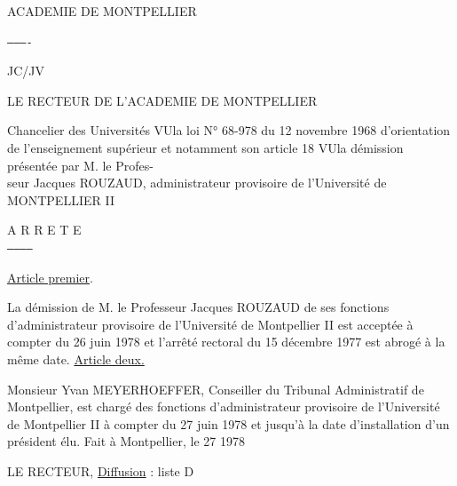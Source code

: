 
ACADEMIE DE MONTPELLIER

\texttt{----------}

JC/JV

LE RECTEUR DE L'ACADEMIE DE MONTPELLIER

Chancelier des Universités
VU\qquad la loi N° 68-978 du 12 novembre 1968 d'orientation de l'enseignement supérieur et notamment son article 18
VU\qquad la démission présentée par M. le Profes-\\
seur Jacques ROUZAUD, administrateur provisoire de l'Université de MONTPELLIER II
\begin{center}
A R R E T E\\
\texttt{-----------}
\end{center}
\uline{Article premier}.

La démission de M. le Professeur Jacques ROUZAUD de ses fonctions d'administrateur provisoire de l'Université de Montpellier II est acceptée à compter du 26 juin 1978 et l'arrêté rectoral du 15 décembre 1977 est abrogé à la même date.
\uline{Article deux.}

Monsieur Yvan MEYERHOEFFER, Conseiller du Tribunal Administratif de Montpellier, est chargé des fonctions d'administrateur provisoire de l'Université de Montpellier II à compter du 27 juin 1978 et jusqu'à la date d'installation d'un président élu.
Fait à Montpellier, le 27  1978

LE RECTEUR,
\uline{Diffusion} : liste D

